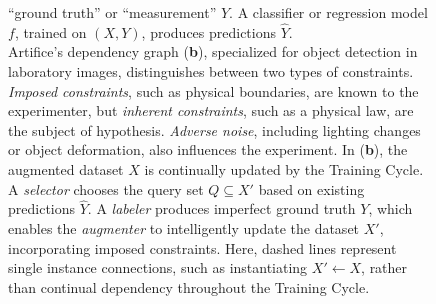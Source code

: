 \documentclass[twocolumn, 10pt]{asme2ej}
\begin{document}
\begin{figure}
{    ``ground truth'' or ``measurement'' $Y$. A classifier or regression model
    $f$, trained on $(X,Y)$, produces predictions $\hat{Y}$.\\
    Artifice's dependency graph (\textbf{b}), specialized for object detection
    in laboratory images, distinguishes between two types of
    constraints. \textit{Imposed constraints}, such as physical boundaries, are
    known to the experimenter, but \textit{inherent constraints}, such as a
    physical law, are the subject of hypothesis. \textit{Adverse noise},
    including lighting changes or object deformation, also influences the
    experiment. In (\textbf{b}), the augmented dataset $X$ is continually
    updated by the Training Cycle. A \textit{selector} chooses the query set
    $Q \subseteq X'$ based on existing predictions $\hat{Y}$. A \textit{labeler}
    produces imperfect ground truth $Y$, which enables the \textit{augmenter} to
    intelligently update the dataset $X'$, incorporating imposed
    constraints. Here, dashed lines represent single instance connections, such
    as instantiating $X' \gets X$, rather than continual dependency throughout
    the Training Cycle.}
  \label{fig:dependency-graphs}
\end{figure}



\end{document}
